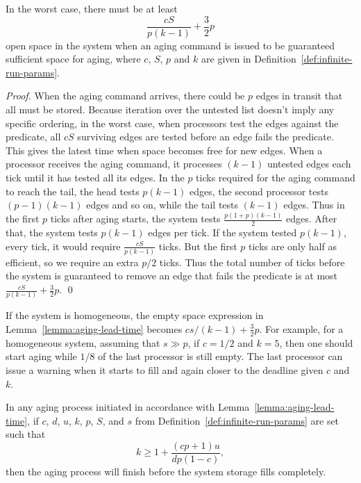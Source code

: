 \begin{lemma} \label{lemma:aging-lead-time}
In the worst case, there must be at least 
$$\frac{cS}{p(k-1)} + \frac{3}{2}p$$
open space in the system when an aging command is issued to be guaranteed sufficient space for aging, where
$c$, $S$, $p$ and $k$ are given in Definition~\ref{def:infinite-run-params}.  
\end{lemma}
\begin{proof}
When the aging command arrives, there could be $p$ edges in transit
that all must be stored. Because iteration over the untested list
doesn't imply
any specific ordering, in the worst case, when processors test the
edges against the predicate, all $cS$ surviving edges are tested
before an edge fails the predicate. This gives the latest time when
space becomes free for new edges. When a processor receives the aging
command, it processes $(k-1)$ untested edges each tick until it has
tested all its edges. In the $p$ ticks required for the aging command
to reach the tail, the head tests $p(k-1)$ edges, the second processor
tests $(p-1)(k-1)$ edges and so on, while the tail tests $(k-1)$
edges.  Thus in the first $p$ ticks after aging starts, the system tests
$\frac{p(1+p)(k-1)}{2}$ edges.  After that, the system tests $p(k-1)$
edges per tick. If the system tested $p(k-1)$, every tick, it would
require  $\frac{cS}{p(k-1)}$ ticks. But the first $p$ ticks are only half
as efficient, so we require an extra $p/2$ ticks. Thus the total
number of ticks before the system is guaranteed to remove an edge that
fails the predicate is at most $\frac{cS}{p(k-1)} + \frac{3}{2}p$.
\qed
\end{proof}

If the system is homogeneous, the empty space expression in Lemma~\ref{lemma:aging-lead-time} becomes $cs/(k-1) + \frac{3}{2}p$. For example, for a homogeneous system, assuming that $s \gg p$, if $c = 1/2$ and $k = 5$, then one should start aging while $1/8$ of the last processor is still empty. The last processor can issue a warning when it starts to fill and again closer to the deadline given $c$ and $k$.

\begin{theorem} \label{thm:infinite-runs}
In any \XSCC aging process initiated in accordance with Lemma~\ref{lemma:aging-lead-time}, if
$c$, $d$, $u$, $k$, $p$, $S$, and $s$ from Definition~\ref{def:infinite-run-params}
are set such that 
             \[k \ge   1 + \frac{(cp + 1) u}{dp (1-c)},\]
then the aging process will finish before the system storage fills completely.
\end{theorem}

